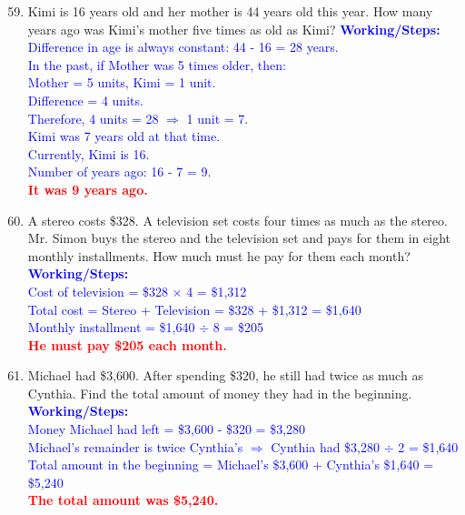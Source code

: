 \documentclass[11pt, a4paper]{article}
\newcommand{\answerline}[1]{\textcolor{red}{\textbf{#1}}}
\newcommand{\working}[1]{\vspace{10pt}\textcolor{blue}{\small \textbf{Working/Steps:}\\ #1}}
\begin{document}
\begin{enumerate}[label=\arabic*.]
    \setcounter{enumi}{58}
    \item Kimi is 16 years old and her mother is 44 years old this year. How many years ago was Kimi's mother five times as old as Kimi?
    \working{Difference in age is always constant: 44 - 16 = 28 years. \\ In the past, if Mother was 5 times older, then: \\ Mother = 5 units, Kimi = 1 unit. \\ Difference = 4 units. \\ Therefore, 4 units = 28 $\Rightarrow$ 1 unit = 7. \\ Kimi was 7 years old at that time. \\ Currently, Kimi is 16. \\ Number of years ago: 16 - 7 = 9. \\ \answerline{It was 9 years ago.}}

    \vspace{4cm}

    \item A stereo costs \$328. A television set costs four times as much as the stereo. Mr. Simon buys the stereo and the television set and pays for them in eight monthly installments. How much must he pay for them each month?
    \working{Cost of television = \$328 $\times$ 4 = \$1,312 \\ Total cost = Stereo + Television = \$328 + \$1,312 = \$1,640 \\ Monthly installment = \$1,640 $\div$ 8 = \$205 \\ \answerline{He must pay \$205 each month.}}

    \vspace{4cm}

    \item Michael had \$3,600. After spending \$320, he still had twice as much as Cynthia. Find the total amount of money they had in the beginning.
    \working{Money Michael had left = \$3,600 - \$320 = \$3,280 \\ Michael's remainder is twice Cynthia's $\Rightarrow$ Cynthia had \$3,280 $\div$ 2 = \$1,640 \\ Total amount in the beginning = Michael's \$3,600 + Cynthia's \$1,640 = \$5,240 \\ \answerline{The total amount was \$5,240.}}

\end{enumerate}

\pagebreak
\end{document}
